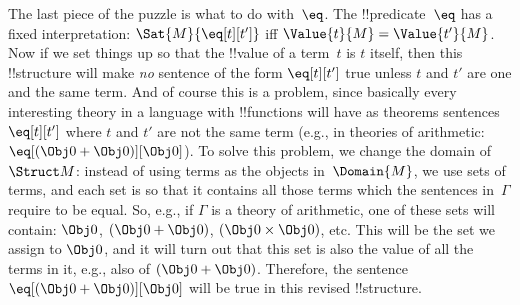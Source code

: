 \documentclass[../../include/open-logic-section]{subfiles}
\begin{document}
The last piece of the puzzle is what to do with~$\eq$.  The
!!{predicate}~$\eq$ has a fixed interpretation: $\Sat{M}{\eq[t][t']}$
iff $\Value{t}{M} = \Value{t'}{M}$. Now if we set things up so that the
!!{value} of a term~$t$ is $t$ itself, then this !!{structure} 
will make \emph{no} sentence of the form $\eq[t][t']$ true
unless $t$ and $t'$ are one and the same term.  And of
course this is a problem, since basically every interesting theory in
a language with !!{function}s will have as theorems sentences
$\eq[t][t']$ where $t$ and $t'$ are not the same term (e.g., in
theories of arithmetic: $\eq[(\Obj 0+ \Obj 0)][\Obj 0]$). To solve
this problem, we change the domain of~$\Struct M$: instead of using terms as
the objects in~$\Domain{M}$, we use sets of terms, and each set is so
that it contains all those terms which the sentences in~$\Gamma$
require to be equal.  So, e.g., if $\Gamma$ is a theory of arithmetic,
one of these sets will contain: $\Obj 0$, $(\Obj 0 + \Obj 0)$, $(\Obj
0 \times \Obj 0)$, etc.  This will be the set we assign to $\Obj 0$,
and it will turn out that this set is also the value of all the terms
in it, e.g., also of $(\Obj 0 + \Obj 0)$. Therefore, the sentence
$\eq[(\Obj 0+ \Obj 0)][\Obj 0]$ will be true in this revised
!!{structure}.
\end{document}
